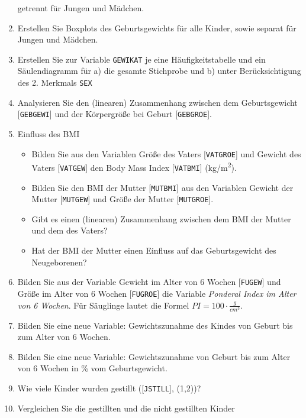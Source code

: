 \documentclass[
  letterpaper,
  DIV=11,
  numbers=noendperiod]{scrartcl}
\providecommand{\tightlist}{%
  \setlength{\itemsep}{0pt}\setlength{\parskip}{0pt}}\usepackage{longtable,booktabs,array}
\begin{document}
\begin{tcolorbox}[enhanced jigsaw, rightrule=.15mm, breakable, arc=.35mm, leftrule=.75mm, bottomrule=.15mm, colframe=quarto-callout-note-color-frame, colback=white, opacityback=0, left=2mm, toprule=.15mm]
\begin{enumerate}
  getrennt für Jungen und Mädchen.
\item
  Erstellen Sie Boxplots des Geburtsgewichts für alle Kinder, sowie
  separat für Jungen und Mädchen.
\item
  Erstellen Sie zur Variable \texttt{GEWIKAT} je eine Häufigkeitstabelle
  und ein Säulendiagramm für a) die gesamte Stichprobe und b) unter
  Berücksichtigung des 2. Merkmals \texttt{SEX}
\item
  Analysieren Sie den (linearen) Zusammenhang zwischen dem
  Geburtsgewicht {[}\texttt{GEBGEWI}{]} und der Körpergröße bei Geburt
  {[}\texttt{GEBGROE}{]}.
\item
  Einfluss des BMI

  \begin{itemize}
  \tightlist
  \item
    Bilden Sie aus den Variablen Größe des Vaters {[}\texttt{VATGROE}{]}
    und Gewicht des Vaters {[}\texttt{VATGEW}{]} den Body Mass Index
    {[}\texttt{VATBMI}{]} (kg/m\textsuperscript{2}).
  \item
    Bilden Sie den BMI der Mutter {[}\texttt{MUTBMI}{]} aus den
    Variablen Gewicht der Mutter {[}\texttt{MUTGEW}{]} und Größe der
    Mutter {[}\texttt{MUTGROE}{]}.
  \item
    Gibt es einen (linearen) Zusammenhang zwischen dem BMI der Mutter
    und dem des Vaters?
  \item
    Hat der BMI der Mutter einen Einfluss auf das Geburtsgewicht des
    Neugeborenen?
  \end{itemize}
\item
  Bilden Sie aus der Variable Gewicht im Alter von 6 Wochen
  {[}\texttt{FUGEW}{]} und Größe im Alter von 6 Wochen
  {[}\texttt{FUGROE}{]} die Variable \emph{Ponderal Index im Alter von 6
  Wochen}. \newline Für Säuglinge lautet die Formel
  \(PI = 100 \cdot \frac{g}{cm^3}\).
\item
  Bilden Sie eine neue Variable: Gewichtszunahme des Kindes von Geburt
  bis zum Alter von 6 Wochen.
\item
  Bilden Sie eine neue Variable: Gewichtszunahme von Geburt bis zum
  Alter von 6 Wochen in \% vom Geburtsgewicht.
\item
  Wie viele Kinder wurden gestillt ({[}\texttt{JSTILL}{]}, (1,2))?
\item
  Vergleichen Sie die gestillten und die nicht gestillten Kinder


\end{enumerate}
\end{tcolorbox}
\end{document}
